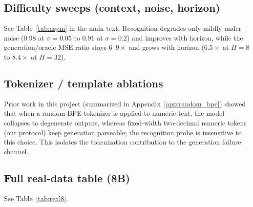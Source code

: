 \documentclass{article}
\begin{document}
\subsection{Difficulty sweeps (context, noise, horizon)}
\label{app:asym}
See Table~\ref{tab:asym} in the main text.  Recognition degrades only mildly
under noise ($0.98$ at $\sigma{=}0.05$ to $0.91$ at $\sigma{=}0.2$) and
improves with horizon, while the generation/oracle MSE ratio stays $6$--$9\times$
and grows with horizon ($6.5\times$ at $H{=}8$ to $8.4\times$ at $H{=}32$).

\subsection{Tokenizer / template ablations}
\label{app:tok}
Prior work in this project (summarized in
Appendix~\ref{app:random_bpe}) showed that when a random-BPE tokenizer is
applied to numeric text, the model collapses to degenerate outputs, whereas
fixed-width two-decimal numeric tokens (our protocol) keep generation
parseable; the recognition probe is insensitive to this choice.  This isolates
the tokenization contribution to the generation failure channel.

\subsection{Full real-data table (8B)}
\label{app:real8}
See Table~\ref{tab:real8}.
\end{document}

